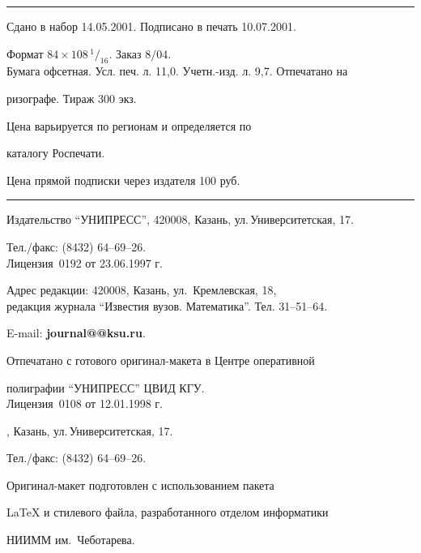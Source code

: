 \bigskip 


\hrule 


\setlength{\hoffset}{-23mm}


\bigskip


\noindent Сдано в набор 14.05.2001. Подписано в печать 10.07.2001.


Формат $84\times 108 \,^1/_{16}.$ Заказ $8/04$.\\


Бумага офсетная. Усл. печ. л. 11,0. Учетн.-изд. л. 9,7. Отпечатано на 


ризографе. Тираж $300$ экз. 





\noindent Цена варьируется по регионам и определяется по 


каталогу Роспечати. 





\noindent Цена прямой подписки через издателя 100 руб. 


\bigskip


\hrule


\bigskip


\noindent Издательство ``УНИПРЕСС'', 420008, Казань, ул.\,Университетская, 17.


Тел./факс: (8432) 64--69--26.\\


Лицензия \No\,0192 от 23.06.1997 г.


\smallskip





\noindent Адрес редакции: 420008, Казань, ул.~Кремлевская, 18,\\  


редакция журнала  ``Известия вузов. Математика''. Тел. 31--51--64.





\noindent E-mail: {\bf journal@@ksu.ru}. \par


\bigskip 


\noindent Отпечатано с готового оригинал-макета в Центре оперативной


полиграфии ``УНИПРЕСС'' ЦВИД КГУ. \\


Лицензия \No\,0108 от 12.01.1998 г.





, Казань, ул.\,Университетская, 17.


Тел./факс: (8432) 64--69--26. \par


\bigskip


\noindent Оригинал-макет подготовлен с использованием пакета


\AmS\LaTeX{} и стилевого файла, разработанного отделом информатики


НИИММ им.~Чеботарева.








